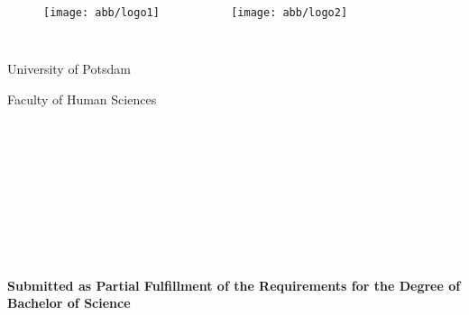 \thispagestyle{empty}


\begin{figure}[t]
 \centering
 \texttt{[image: abb/logo1]}
~~~~~~~~~~
 \texttt{[image: abb/logo2]}
\end{figure}


\begin{verbatim}


\end{verbatim}

\begin{center}
\Large{University of Potsdam}\\
\end{center}


\begin{center}
\Large{Faculty of Human Sciences}
\end{center}
\begin{verbatim}




\end{verbatim}
\begin{center}
\doublespacing
\textbf{\LARGE{\titleDocument}}\\
\singlespacing
\begin{verbatim}

\end{verbatim}
\textbf{{~\subjectDocument~}}
\end{center}
\begin{verbatim}

\end{verbatim}
\begin{center}

\end{center}
\begin{verbatim}

\end{verbatim}
\begin{center}
\textbf{Submitted as Partial Fulfillment of the Requirements for the Degree of \\ Bachelor of Science}
\end{center}
\begin{verbatim}






\end{verbatim}
